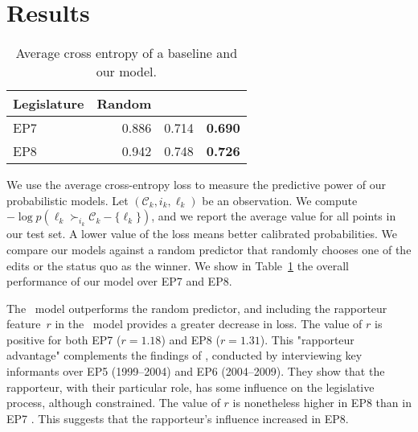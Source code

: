 \section{Results}
\label{sec:results}

\begin{table}
	\caption{
		Average cross entropy of a baseline and our model.
	}
	\label{tab:results}
	\begin{tabular}{lrrr}
		\toprule
		Legislature & Random & \wow\  & \wowr          \\
		\midrule
		EP7         & 0.886  & 0.714  & \textbf{0.690} \\
		EP8         & 0.942  & 0.748  & \textbf{0.726} \\
		\bottomrule
	\end{tabular}
\end{table}

We use the average cross-entropy loss to measure the predictive power of our probabilistic models.
Let $ ( \mathcal{C}_k, i_k, \ell_k )$ be an observation.
We compute $ -\log p(\ell_k \succ_{i_k} \mathcal{C}_k - \{\ell_k\} ) $, and we report the average value for all points in our test set.
A lower value of the loss means better calibrated probabilities.
We compare our models against a random predictor that randomly chooses one of the edits or the status quo as the winner.
We show in Table~\ref{tab:results} the overall performance of our model over EP7 and EP8.

The \wow\ model outperforms the random predictor, and including the rapporteur feature~$r$ in the \wowr\ model provides a greater decrease in loss.
The value of $r$ is positive for both EP7 ($ r=1.18 $) and EP8 ($ r=1.31 $).
This "rapporteur advantage" complements the findings of \cite{costello2010policy}, conducted by interviewing key informants over EP5 (1999--2004) and EP6 (2004--2009).
They show that the rapporteur, with their particular role, has some influence on the legislative process, although constrained.
The value of $r$ is nonetheless higher in EP8 than in EP7 .
This suggests that the rapporteur's influence increased in EP8.

